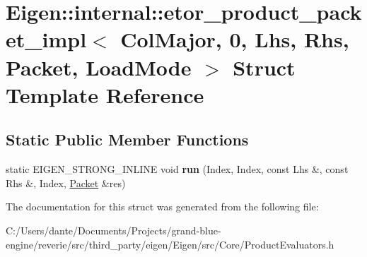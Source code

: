 \hypertarget{struct_eigen_1_1internal_1_1etor__product__packet__impl_3_01_col_major_00_010_00_01_lhs_00_01_rh608f8b3bd7848082420c49062c17a738}{}\section{Eigen\+::internal\+::etor\+\_\+product\+\_\+packet\+\_\+impl$<$ Col\+Major, 0, Lhs, Rhs, Packet, Load\+Mode $>$ Struct Template Reference}
\label{struct_eigen_1_1internal_1_1etor__product__packet__impl_3_01_col_major_00_010_00_01_lhs_00_01_rh608f8b3bd7848082420c49062c17a738}
\subsection*{Static Public Member Functions}
\begin{DoxyCompactItemize}
\item 
\mbox{\label{struct_eigen_1_1internal_1_1etor__product__packet__impl_3_01_col_major_00_010_00_01_lhs_00_01_rh608f8b3bd7848082420c49062c17a738_ab5bd5c2e1ef7f99f07d45f645fd88a00}} 
static E\+I\+G\+E\+N\+\_\+\+S\+T\+R\+O\+N\+G\+\_\+\+I\+N\+L\+I\+NE void {\bfseries run} (Index, Index, const Lhs \&, const Rhs \&, Index, \mbox{\hyperlink{union_eigen_1_1internal_1_1_packet}{Packet}} \&res)
\end{DoxyCompactItemize}


The documentation for this struct was generated from the following file\+:\begin{DoxyCompactItemize}
\item 
C\+:/\+Users/dante/\+Documents/\+Projects/grand-\/blue-\/engine/reverie/src/third\+\_\+party/eigen/\+Eigen/src/\+Core/Product\+Evaluators.\+h\end{DoxyCompactItemize}
